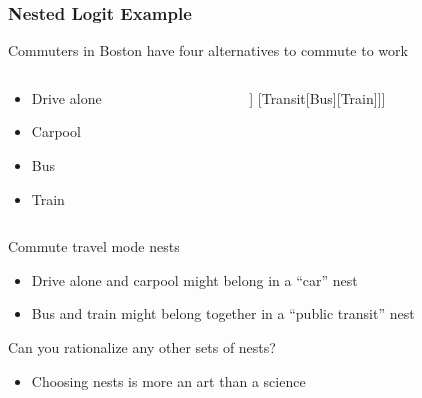 \documentclass{beamer}
\begin{document}
\begin{frame}\frametitle{Nested Logit Example}
    Commuters in Boston have four alternatives to commute to work
    \begin{columns}
    	\begin{column}{0.5\textwidth}
   			\begin{itemize}
    			\item Drive alone
    			\item Carpool
    			\item Bus
    			\item Train
    		\end{itemize}
    		\vspace{4ex}
		\end{column}
		\begin{column}{0.5\textwidth}
   			\begin{forest}
		    	[Commuter [Car[Drive][Carpool]] [Transit[Bus][Train]]]
		    \end{forest}
		\end{column}
    \end{columns}
    \vspace{2ex}
    Commute travel mode nests
    \begin{itemize}
    	\item Drive alone and carpool might belong in a ``car'' nest
    	\item Bus and train might belong together in a ``public transit'' nest
    \end{itemize}
    \vspace{2ex}
    Can you rationalize any other sets of nests?
    \begin{itemize}
    	\item Choosing nests is more an art than a science
    \end{itemize}
\end{frame}
\end{document}

